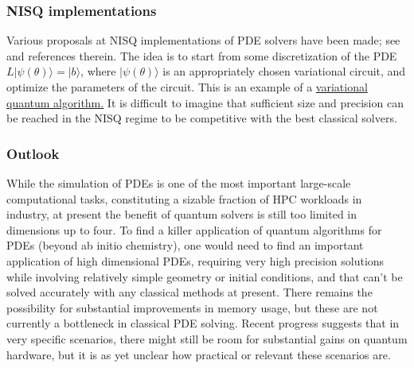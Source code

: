 \begin{refsection}
\subsubsection*{NISQ implementations}

Various proposals at NISQ implementations of PDE solvers have been made; see \cite{leong2022variational} and references therein. The idea is to start from some discretization of the PDE $L|\psi(\theta)\rangle = |b\rangle$, where $|\psi(\theta)\rangle$ is an appropriately chosen variational circuit, and optimize the parameters of the circuit. This is an example of a \hyperref[prim:VQA]{variational quantum algorithm.} It is difficult to imagine that sufficient size and precision can be reached in the NISQ regime to be competitive with the best classical solvers. 


\subsubsection*{Outlook}
While the simulation of PDEs is one of the most important large-scale computational tasks, constituting a sizable fraction of HPC workloads in industry, at present the benefit of quantum solvers is still too limited in dimensions up to four. To find a killer application of quantum algorithms for PDEs (beyond ab initio chemistry), one would need to find an important application of high dimensional PDEs, requiring very high precision solutions while involving relatively simple geometry or initial conditions, and that can't be solved accurately with any classical methods at present. There remains the possibility for substantial improvements in memory usage, but these are not currently a bottleneck in classical PDE solving. 
Recent progress \cite{fang2022time,babbush2023exponential} suggests that in very specific scenarios, there might still be room for substantial gains on quantum hardware, but it is as yet unclear how practical or relevant these scenarios are. 




\printbibliography[heading=secbib,segment=\therefsegment]
\end{refsection}

\newpage